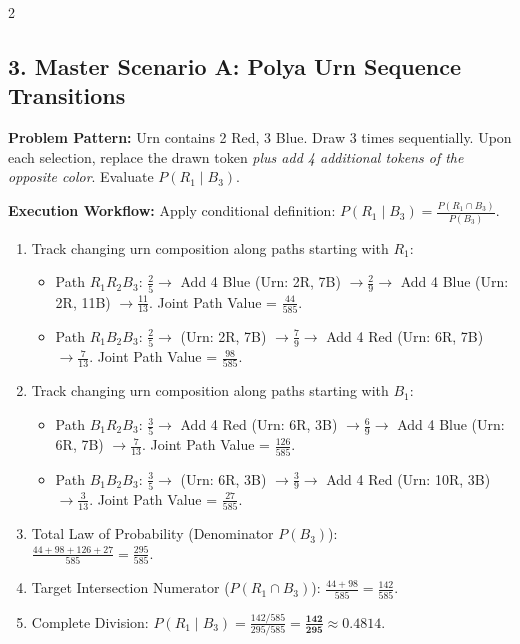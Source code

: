 \documentclass[9pt,landscape]{article}
\begin{document}
\begin{multicols*}{2}
\subsection*{3. Master Scenario A: Polya Urn Sequence Transitions}
\textbf{Problem Pattern:} Urn contains 2 Red, 3 Blue. Draw 3 times sequentially. Upon each selection, replace the drawn token \textit{plus add 4 additional tokens of the opposite color}. Evaluate $P(R_1 \mid B_3)$.

\textbf{Execution Workflow:}
Apply conditional definition: $P(R_1 \mid B_3) = \frac{P(R_1 \cap B_3)}{P(B_3)}$.
\begin{enumerate}
    \item Track changing urn composition along paths starting with $R_1$:
    \begin{itemize}
        \item Path $R_1 R_2 B_3$: $\frac{2}{5} \rightarrow$ Add 4 Blue (Urn: 2R, 7B) $\rightarrow \frac{2}{9} \rightarrow$ Add 4 Blue (Urn: 2R, 11B) $\rightarrow \frac{11}{13}$. Joint Path Value = $\frac{44}{585}$.
        \item Path $R_1 B_2 B_3$: $\frac{2}{5} \rightarrow$ (Urn: 2R, 7B) $\rightarrow \frac{7}{9} \rightarrow$ Add 4 Red (Urn: 6R, 7B) $\rightarrow \frac{7}{13}$. Joint Path Value = $\frac{98}{585}$.
    \end{itemize}
    \item Track changing urn composition along paths starting with $B_1$:
    \begin{itemize}
        \item Path $B_1 R_2 B_3$: $\frac{3}{5} \rightarrow$ Add 4 Red (Urn: 6R, 3B) $\rightarrow \frac{6}{9} \rightarrow$ Add 4 Blue (Urn: 6R, 7B) $\rightarrow \frac{7}{13}$. Joint Path Value = $\frac{126}{585}$.
        \item Path $B_1 B_2 B_3$: $\frac{3}{5} \rightarrow$ (Urn: 6R, 3B) $\rightarrow \frac{3}{9} \rightarrow$ Add 4 Red (Urn: 10R, 3B) $\rightarrow \frac{3}{13}$. Joint Path Value = $\frac{27}{585}$.
    \end{itemize}
    \item Total Law of Probability (Denominator $P(B_3)$): \\
    $\frac{44 + 98 + 126 + 27}{585} = \frac{295}{585}$.
    \item Target Intersection Numerator ($P(R_1 \cap B_3)$): $\frac{44 + 98}{585} = \frac{142}{585}$.
    \item Complete Division: $P(R_1 \mid B_3) = \frac{142/585}{295/585} = \mathbf{\frac{142}{295} \approx 0.4814}$.
\end{enumerate}


\end{multicols*}
\end{document}
